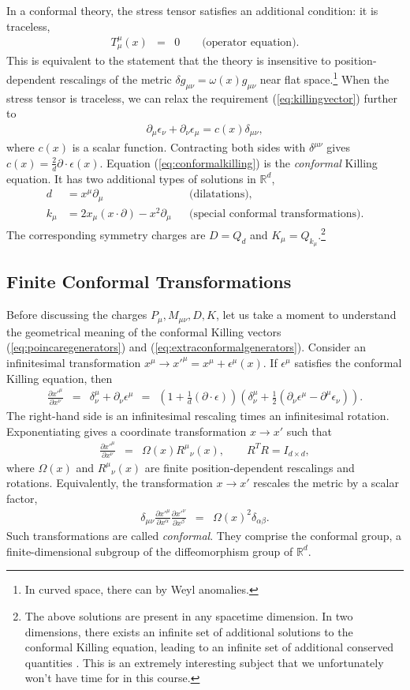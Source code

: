 \documentclass[11pt]{ws-rv9x6}
\newcommand\be{\begin{eqnarray}}
\newcommand\ee{\end{eqnarray}}
\newcommand\p[1]{\left(#1\right)}
\newcommand\ptl\partial
\newcommand\e\epsilon
\newcommand\<\langle
\renewcommand\>\rangle
\newcommand\de\delta
\newcommand\R{\mathbb{R}}
\newcommand\nn{\nonumber}
\renewcommand\.{\cdot}
\newcommand\x\times
\newcommand\pdr[2]{\frac{\partial #1}{\partial #2}}
\begin{document}
In a conformal theory, the stress tensor satisfies an additional condition: it is traceless,
\be
T_\mu^\mu(x) &=& 0 \qquad\textrm{(operator equation)}.
\ee
This is equivalent to the statement that the theory is insensitive to position-dependent rescalings of the metric $\de g_{\mu\nu}=\omega(x) g_{\mu\nu}$ near flat space.\footnote{In curved space, there can by Weyl anomalies.} When the stress tensor is traceless, we can relax the requirement (\ref{eq:killingvector}) further to
\be
\label{eq:conformalkilling}
\ptl_\mu\e_\nu + \ptl_\nu \e_\mu = c(x)\de_{\mu\nu},
\ee
where $c(x)$ is a scalar function.  Contracting both sides with $\de^{\mu\nu}$ gives $c(x)=\frac{2}{d}\ptl\.\e(x)$.  Equation (\ref{eq:conformalkilling}) is the {\it conformal\/} Killing equation.  It has two additional types of solutions in $\R^d$,
\begin{align}
\label{eq:extraconformalgenerators}
d &= x^\mu \ptl_\mu &&\textrm{(dilatations)},\nn\\
k_\mu &= 2x_\mu (x\.\ptl)-x^2\ptl_\mu &&\textrm{(special conformal transformations)}.
\end{align}
The corresponding symmetry charges are $D=Q_d$ and $K_\mu=Q_{k_\mu}$.\footnote{The above solutions are present in any spacetime dimension.  In two dimensions, there exists an infinite set of additional solutions to the conformal Killing equation, leading to an infinite set of additional conserved quantities \cite{Belavin:1984vu}.  This is an extremely interesting subject that we unfortunately won't have time for in this course.}

\subsection{Finite Conformal Transformations}

Before discussing the charges $P_\mu,M_{\mu\nu},D,K$, let us take a moment to understand the geometrical meaning of the conformal Killing vectors (\ref{eq:poincaregenerators}) and (\ref{eq:extraconformalgenerators}).  Consider an infinitesimal transformation $x^\mu\to x'^\mu=x^\mu+\e^\mu(x)$.  If $\e^\mu$ satisfies the conformal Killing equation, then
\be
\label{eq:conformalinfinitesimal}
\pdr{x'^\mu}{x^\nu} &=& \de^{\mu}_\nu+\ptl_\nu\e^\mu
\ \ =\ \ \p{1+\frac 1 d (\ptl\.\e)}\p{\de^\mu_\nu + \frac 1 2\p{\ptl_\nu \e^\mu - \ptl^\mu \e_\nu}}.
\ee
The right-hand side is an infinitesimal rescaling times an infinitesimal rotation.  Exponentiating gives a coordinate transformation $x\to x'$ such that
\be
\label{eq:conformalfinite}
\pdr{x'^\mu}{x^\nu} &=& \Omega(x)R^\mu{}_\nu{}(x),\qquad R^TR=I_{d\x d},
\ee
where $\Omega(x)$ and $R^\mu{}_\nu{}(x)$ are finite position-dependent rescalings and rotations.
Equivalently, the transformation $x\to x'$ rescales the metric by a scalar factor,
\be
\delta_{\mu\nu}\pdr{x'^\mu}{x^\alpha}\pdr{x'^\nu}{x^\beta} &=& \Omega(x)^2\de_{\alpha\beta}.
\ee
Such transformations are called {\it conformal}. They comprise the conformal group, a finite-dimensional subgroup of the diffeomorphism group of $\R^d$.
\end{document}
